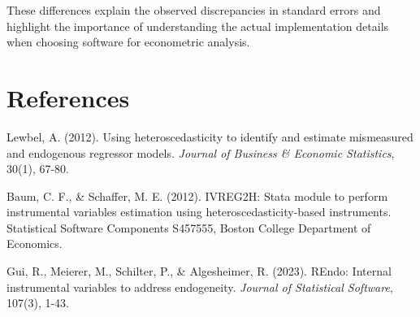 \documentclass[12pt]{article}
\begin{document}
These differences explain the observed discrepancies in standard errors and highlight the importance of understanding the actual implementation details when choosing software for econometric analysis.

\section*{References}

Lewbel, A. (2012). Using heteroscedasticity to identify and estimate mismeasured and endogenous regressor models. \textit{Journal of Business \& Economic Statistics}, 30(1), 67-80.

Baum, C. F., \& Schaffer, M. E. (2012). IVREG2H: Stata module to perform instrumental variables estimation using heteroscedasticity-based instruments. Statistical Software Components S457555, Boston College Department of Economics.

Gui, R., Meierer, M., Schilter, P., \& Algesheimer, R. (2023). REndo: Internal instrumental variables to address endogeneity. \textit{Journal of Statistical Software}, 107(3), 1-43.
\end{document}
